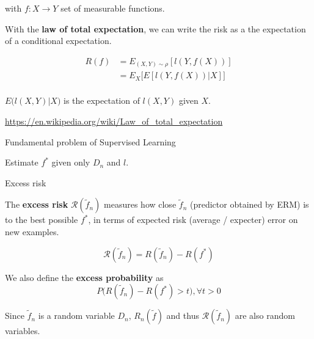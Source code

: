 \documentclass[
10pt, %
a4paper, %
oneside, %
headinclude,footinclude, %
BCOR5mm, %
]{scrartcl}
\begin{document}
with $f:X\rightarrow Y$ set of measurable functions.

\begin{remark}
    With the \textbf{{law of total expectation}}, we can write the risk as a the
    expectation of a conditional expectation.

    \begin{equation}
        \begin{aligned}
            \label{eq:}
            R(f) &= E_{(X,Y)\sim \rho}[l(Y,f(X))]\\
            &= E_{X}\Big[E[l(Y,f(X))|X]\Big]\\
        \end{aligned}
    \end{equation}

    $E\big(l(X,Y)|X \big) $ is the expectation of $l(X, Y)$ given $X$.

    \url{https://en.wikipedia.org/wiki/Law_of_total_expectation} 
\end{remark}


\begin{definition}{Fundamental problem of Supervised Learning}

    Estimate $f^*$ given only $D_n$ and $l$.
    
\end{definition}

\begin{definition}{Excess risk}

    The \textbf{{excess risk}} $ \mathcal{R} ( \tilde{f}_n)$ measures how close  $ \tilde{f}_n$ (predictor obtained by ERM) is to the best possible $f^*$, in terms of expected risk (average / expecter) error on new examples.

    \begin{equation}
	\mathcal{R} ( \tilde{f}_n) = R( \tilde{f}_n)-R(f^*)
    \end{equation}

    We also define the \textbf{{excess probability}} as
    \begin{equation*}
	P\big( R( \tilde{f}_n)-R(f^*)>t\big), \forall t>0
    \end{equation*}
\end{definition}

\begin{remark}
Since $ \tilde{f}_n$ is a random variable $D_n$, $R_n( \tilde{f})$ and thus $ \mathcal{R} ( \tilde{f}_n)$ are also random variables.
\end{remark}
\end{document}
